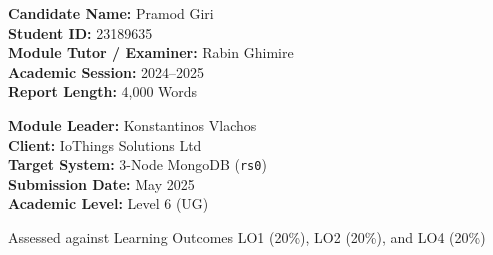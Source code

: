 \documentclass[11pt,a4paper]{article}
\begin{document}
\begin{titlepage}
    \begin{minipage}{0.54\textwidth}
        \begin{flushleft}
            \large
            \textbf{Candidate Name:} Pramod Giri\\
            \textbf{Student ID:} 23189635\\
            \textbf{Module Tutor / Examiner:} Rabin Ghimire\\
            \textbf{Academic Session:} 2024--2025\\
            \textbf{Report Length:} 4,000 Words
        \end{flushleft}
    \end{minipage}
    \hfill
    \begin{minipage}{0.42\textwidth}
        \begin{flushright}
            \large
            \textbf{Module Leader:} Konstantinos Vlachos\\
            \textbf{Client:} IoThings Solutions Ltd\\
            \textbf{Target System:} 3-Node MongoDB (\texttt{rs0})\\
            \textbf{Submission Date:} May 2025\\
            \textbf{Academic Level:} Level 6 (UG)
        \end{flushright}
    \end{minipage}

    \vfill
    {\footnotesize\textsf{Assessed against Learning Outcomes LO1 (20\%), LO2 (20\%), and LO4 (20\%)}\par}
\end{titlepage}

\newpage
{}
\setcounter{page}{1}

\tableofcontents
\newpage

{}
\listoftables
\vspace{1.2cm}

{}
\listoffigures
\newpage

\end{document}
